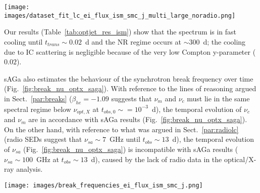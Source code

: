 \documentclass{aa}
\begin{document}
%
\begin{figure*} %
\centering
{\texttt{[image: images/dataset\_fit\_lc\_ei\_flux\_ism\_smc\_j\_multi\_large\_noradio.png]}}
\caption{Broadband modelling (from optical to X-ray frequencies; Table~\ref{tab:optjet_res_ism}, second column) of GRB\,160131A.
See the caption of Fig.~\ref{fig:lc_uvoir_saga} for a full description of the modelling.
Filled circles indicate detections, and downward triangles indicate $3\sigma$ upper limits.
For completeness we include all the radio data (dashed lines, not modelled in this approach) and relative light curves (derived from optical/X-ray modelling).}
\label{fig:lc_optuvx_saga}
\end{figure*}

Our results (Table~\ref{tab:optjet_res_ism}) show that the spectrum is in fast cooling until $t_{trans} \sim 0.02$~d and the NR regime occurs at $\sim 300$~d; the cooling due to IC scattering is negligible because of the very low Compton y-parameter ($0.02$).

{\sc sAGa} also estimates the behaviour of the synchrotron break frequency over time (Fig.~\ref{fig:break_nu_optx_saga}).
With reference to the lines of reasoning argued in Sect.~\ref{par:breaks} ($\beta_{he} = -1.09$ suggests that $\nu_m$ and $\nu_c$ must lie in the same spectral regime below $\nu_{opt,X}$ at $t_{obs,0} \sim = 10^{-3}$~d), the temporal evolution of $\nu_c$ and $\nu_m$ are in accordance with {\sc sAGa} results (Fig.~\ref{fig:break_nu_optx_saga}).
On the other hand, with reference to what was argued in Sect.~\ref{par:radiolc} (radio SEDs suggest that $\nu_{sa} \sim 7$~GHz until $t_{obs} \sim 13$~d), the temporal evolution of $\nu_{sa}$ (Fig.~\ref{fig:break_nu_optx_saga}) is incompatible with {\sc sAGa} results ($\nu_{sa} \sim 100$~GHz at $t_{obs} \sim 13$~d), caused by the lack of radio data in the optical/X-ray analysis.
%
\begin{figure*} %
\centering
{\texttt{[image: images/break\_frequencies\_ei\_flux\_ism\_smc\_j.png]}}
\caption{Temporal evolution of the synchrotron break frequencies for afterglow emission of GRB\,160131A, based on analysis of UVOIR/X-ray data (Table~\ref{tab:optjet_res_ism}, second column).
See the caption of Fig.~\ref{fig:lc_uvoir_saga} for a full description of the modelling.
The self-absorption frequency produced by noncooled electrons $\nu_{ac}$ makes sense only in fast-cooling regime ($\lesssim 0.02$~d).}
\label{fig:break_nu_optx_saga}
\end{figure*}
\end{document}
